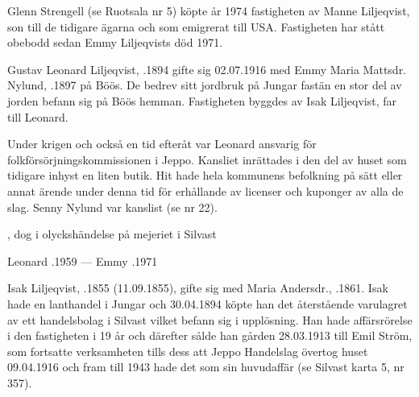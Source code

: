 

Glenn Strengell (se Ruotsala nr 5) köpte år 1974 fastigheten av Manne Liljeqvist, son till de tidigare ägarna och som emigrerat till USA. Fastigheten har stått obebodd sedan Emmy Liljeqvists död 1971.\jhvspace{}



Gustav Leonard Liljeqvist, .1894 gifte sig 02.07.1916 med Emmy Maria Mattsdr. Nylund, .1897 på Böös. De bedrev sitt jordbruk på Jungar fastän en stor del av jorden befann sig på Böös hemman. Fastigheten byggdes av Isak Liljeqvist, far till Leonard.

Under krigen och också en tid efteråt var Leonard ansvarig för folkförsörjningskommissionen i Jeppo. Kansliet inrättades i den del av huset som tidigare inhyst en liten butik. Hit hade hela kommunens befolkning på sätt eller annat ärende under denna tid för erhållande av licenser och kuponger av alla de slag. Senny Nylund var kanslist (se nr 22).
\begin{jhchildren}
  \item {}, dog i olyckshändelse på mejeriet i Silvast
  \item {}
  \item {}
  \item {}
  \item {}
\end{jhchildren}

Leonard .1959  ---  Emmy .1971


Isak Liljeqvist, .1855 (11.09.1855), gifte sig med Maria Andersdr., .1861. Isak hade  en lanthandel i Jungar och 30.04.1894 köpte han det återstående varulagret av ett handelsbolag i Silvast vilket befann sig i upplösning. Han hade affärsrörelse i den fastigheten i 19 år och därefter sålde han gården 28.03.1913 till Emil Ström,  som fortsatte verksamheten tills dess att Jeppo Handelslag övertog huset 09.04.1916 och fram till 1943 hade det som sin huvudaffär (se Silvast karta 5, nr 357).

